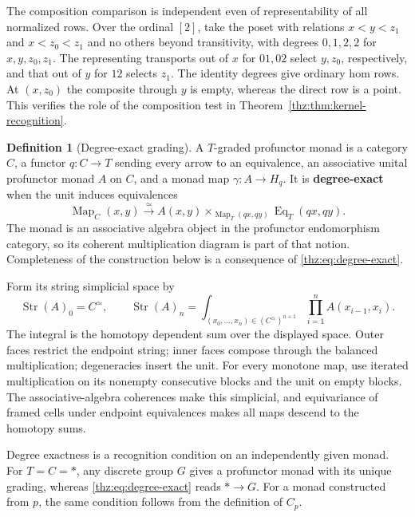 \documentclass[oneside]{article}
\theoremstyle{plain}
\theoremstyle{definition}
\newtheorem{definition}[theorem]{Definition}
\theoremstyle{remark}
\newcommand{\Map}{\operatorname{Map}}
\newcommand{\core}{\simeq}
\begin{document}
The composition comparison is independent even of representability of all
normalized rows. Over the ordinal $[2]$, take the poset with relations
$x<y<z_1$ and $x<z_0<z_1$ and no others beyond transitivity, with
degrees $0,1,2,2$ for $x,y,z_0,z_1$. The representing transports out
of $x$ for $01,02$ select $y,z_0$, respectively, and that out of $y$
for $12$ selects $z_1$. The identity degrees give ordinary hom rows.
At $(x,z_0)$ the composite through $y$ is empty, whereas the direct
row is a point. This verifies the role of the composition test in
Theorem~\ref{thz:thm:kernel-recognition}.

\begin{definition}[Degree-exact grading]
\label{thz:def:graded-normal}
A $T$-graded profunctor monad is a category $C$, a functor $q:C\to T$
sending every arrow to an equivalence, an associative unital profunctor
monad $A$ on $C$, and a monad map $\gamma:A\to H_q$.  It is
\textbf{degree-exact} when the unit induces equivalences
\begin{equation}\label{thz:eq:degree-exact}
 \Map_C(x,y)\xrightarrow{\simeq}
 A(x,y)\times_{\Map_T(qx,qy)}\operatorname{Eq}_T(qx,qy).
\end{equation}
The monad is an associative algebra object in the profunctor endomorphism
category, so its coherent multiplication diagram is part of that notion.
Completeness of the construction below is a consequence of
\eqref{thz:eq:degree-exact}.
\end{definition}

Form its string simplicial space by
\begin{equation}\label{thz:eq:normal-string}
 \operatorname{Str}(A)_0=C^\core,\qquad
 \operatorname{Str}(A)_n=
 \int_{(x_0,\ldots,x_n)\in(C^\core)^{n+1}}
          \prod_{i=1}^n A(x_{i-1},x_i).
\end{equation}
The integral is the homotopy dependent sum over the displayed space.
Outer faces restrict the endpoint string; inner faces compose through the
balanced multiplication; degeneracies insert the unit.  For every monotone
map, use iterated multiplication on its nonempty consecutive blocks and
the unit on empty blocks.  The associative-algebra coherences make this
simplicial, and equivariance of framed cells under endpoint equivalences
makes all maps descend to the homotopy sums.

Degree exactness is a recognition condition on an independently given
monad. For $T=C=*$, any discrete group $G$ gives a profunctor monad
with its unique grading, whereas \eqref{thz:eq:degree-exact} reads
$*\to G$. For a monad constructed from $p$, the same condition follows
from the definition of $C_p$.
\end{document}

